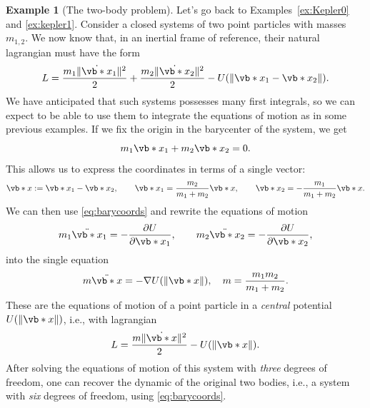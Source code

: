 \documentclass[english,fontsize=11pt,paper=b5]{scrbook}
\theoremstyle{definition}
\newtheorem{example}{Example}[chapter]
\begin{document}
    \begin{example}[The two-body problem]\label{ex:kepler2}
      Let's go back to Examples~\ref{ex:Kepler0} and \ref{ex:kepler1}.
      Consider a closed systems of two point particles with masses $m_{1,2}$.
      We now know that, in an inertial frame of reference, their natural lagrangian must have the form
      \begin{equation}
        L = \frac{m_1 \|\dot{\vb*{x}}_1\|^2}{2} + \frac{m_2 \|\dot{\vb*{x}}_2\|^2}{2} - U(\|\vb*{x}_1 - \vb*{x}_2\|).
      \end{equation}
      We have anticipated that such systems possesses many first integrals, so we can expect to be able to use them to integrate the equations of motion as in some previous examples.
      If we fix the origin in the barycenter of the system, we get
      \begin{equation}
        m_1 \vb*{x}_1 + m_2 \vb*{x}_2 = 0.
      \end{equation}
      This allows us to express the coordinates in terms of a single vector:
      \begin{equation}\label{eq:barycoords}
        \vb*{x} := \vb*{x}_1 - \vb*{x}_2, \qquad
        \vb*{x}_1 = \frac{m_2}{m_1 + m_2} \vb*{x}, \qquad
        \vb*{x}_2 = -\frac{m_1}{m_1 + m_2} \vb*{x}.
      \end{equation}
      We can then use \eqref{eq:barycoords} and rewrite the equations of motion
      \begin{equation}
        m_1 \ddot{\vb*{x}}_1 = -\frac{\partial U}{\partial \vb*{x}_1}, \qquad m_2 \ddot{\vb*{x}}_2 = -\frac{\partial U}{\partial \vb*{x}_2},
      \end{equation}
      into the single equation
      \begin{equation}
        m \ddot{\vb*{x}} = -\nabla U(\|\vb*{x}\|), \quad m = \frac{m_1m_2}{m_1+m_2}.
      \end{equation}
      These are the equations of motion of a point particle in a \emph{central} potential $U(\|\vb*{x}\|)$, i.e., with lagrangian
      \begin{equation}\label{eq:centralpot}
        L = \frac{m \|\dot{\vb*{x}}\|^2}{2} - U(\|\vb*{x}\|).
      \end{equation}
      After solving the equations of motion of this system with \emph{three} degrees of freedom, one can recover the dynamic of the original two bodies, i.e., a system with \emph{six} degrees of freedom, using \eqref{eq:barycoords}.
    \end{example}
\end{document}
